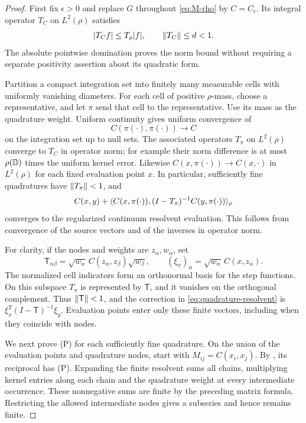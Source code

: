 \begin{proof}
First fix $\epsilon>0$ and replace $G$ throughout \eqref{eq:M-rho} by $C=C_\epsilon$. Its integral operator $T_C$ on $L^2(\rho)$ satisfies
\[
|T_Cf|\le T_\rho|f|,\qquad \lVert T_C\rVert\le d<1.
\]
The absolute pointwise domination proves the norm bound without requiring a separate positivity assertion about its quadratic form.

Partition a compact integration set into finitely many measurable cells with uniformly vanishing diameters. For each cell of positive $\rho$-mass, choose a representative, and let $\pi$ send that cell to the representative. Use its mass as the quadrature weight. Uniform continuity gives uniform convergence of
\[
C(\pi(\cdot),\pi(\cdot))\longrightarrow C
\]
on the integration set up to null sets. The associated operators $T_\pi$ on $L^2(\rho)$ converge to $T_C$ in operator norm; for example their norm difference is at most $\rho(\mathbb D)$ times the uniform kernel error. Likewise $C(x,\pi(\cdot))\to C(x,\cdot)$ in $L^2(\rho)$ for each fixed evaluation point $x$. In particular, sufficiently fine quadratures have $\lVert T_\pi\rVert<1$, and
\begin{equation}\label{eq:quadrature-resolvent}
C(x,y)+\langle C(x,\pi(\cdot)),(I-T_\pi)^{-1}C(y,\pi(\cdot))\rangle_\rho
\end{equation}
converges to the regularized continuum resolvent evaluation. This follows from convergence of the source vectors and of the inverses in operator norm.

For clarity, if the nodes and weights are $z_\alpha,w_\alpha$, set
\[
\mathsf T_{\alpha\beta}
=\sqrt{w_\alpha}\,C(z_\alpha,z_\beta)\sqrt{w_\beta},
\qquad
(\xi_x)_\alpha=\sqrt{w_\alpha}\,C(x,z_\alpha).
\]
The normalized cell indicators form an orthonormal basis for the step functions. On this subspace $T_\pi$ is represented by $\mathsf T$, and it vanishes on the orthogonal complement. Thus $\lVert \mathsf T\rVert<1$, and the correction in \eqref{eq:quadrature-resolvent} is $\xi_x^T(I-\mathsf T)^{-1}\xi_y$. Evaluation points enter only these finite vectors, including when they coincide with nodes.

We next prove \textup{(P)} for each sufficiently fine quadrature. On the union of the evaluation points and quadrature nodes, start with $M_{ij}=C(x_i,x_j)$. By , its reciprocal has \textup{(P)}. Expanding the finite resolvent sums all chains, multiplying kernel entries along each chain and the quadrature weight at every intermediate occurrence. These nonnegative sums are finite by the preceding matrix formula. Restricting the allowed intermediate nodes gives a subseries and hence remains finite.


\end{proof}
